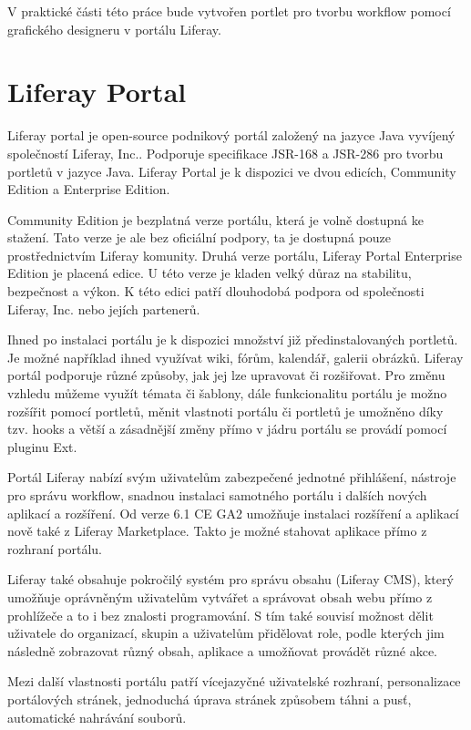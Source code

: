 \documentclass{fithesis}
\begin{document}
V praktické části této práce bude vytvořen portlet pro tvorbu workflow pomocí grafického designeru v portálu Liferay.

\section{Liferay Portal}
Liferay portal je open-source podnikový portál založený na jazyce Java vyvíjený společností Liferay, Inc.. Podporuje specifikace JSR-168 a JSR-286 pro tvorbu portletů v jazyce Java. Liferay Portal je k dispozici ve dvou edicích, Community Edition a Enterprise Edition.

Community Edition je bezplatná verze portálu, která je volně dostupná ke stažení. Tato verze je ale bez oficiální podpory, ta je dostupná pouze prostřednictvím Liferay komunity. Druhá verze portálu, Liferay Portal Enterprise Edition je placená edice. U této verze je kladen velký důraz na stabilitu, bezpečnost a výkon. K této edici patří dlouhodobá podpora od společnosti Liferay, Inc. nebo jejích partenerů.

Ihned po instalaci portálu je k dispozici množství již předinstalovaných portletů. Je možné například ihned využívat wiki, fórům, kalendář, galerii obrázků. Liferay portál podporuje různé způsoby, jak jej lze upravovat či rozšiřovat. Pro změnu vzhledu můžeme využít témata či šablony, dále funkcionalitu portálu je možno rozšířit pomocí portletů, měnit vlastnoti portálu či portletů je umožněno díky tzv. hooks a větší a zásadnější změny přímo v jádru portálu se provádí pomocí pluginu Ext. \cite{developer-guide}

Portál Liferay nabízí svým uživatelům zabezpečené jednotné přihlášení, nástroje pro správu workflow, snadnou instalaci samotného portálu i dalších nových aplikací a rozšíření. Od verze 6.1 CE GA2 umožňuje instalaci rozšíření a aplikací nově také z Liferay Marketplace. Takto je možné stahovat aplikace přímo z rozhraní portálu.

Liferay také obsahuje pokročilý systém pro správu obsahu (Liferay CMS), který umožňuje oprávněným uživatelům vytvářet a správovat obsah webu přímo z prohlížeče a to i bez znalosti programování. S tím také souvisí možnost dělit uživatele do organizací, skupin a uživatelům přidělovat role, podle kterých jim následně zobrazovat různý obsah, aplikace a umožňovat provádět různé akce.

Mezi další vlastnosti portálu patří vícejazyčné uživatelské rozhraní, personalizace portálových stránek, jednoduchá úprava stránek způsobem táhni a pusť, automatické nahrávání souborů.
\end{document}
